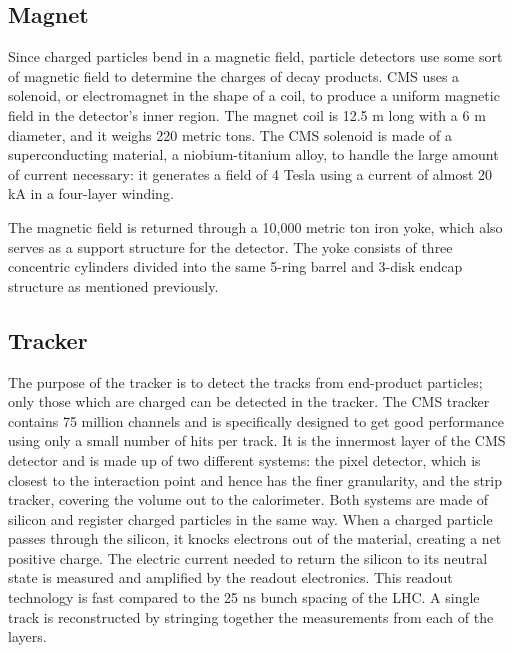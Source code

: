 \subsection{Magnet}

Since charged particles bend in a magnetic field, 
particle detectors use some sort of magnetic field to determine 
the charges of decay products.  
CMS uses a solenoid, or electromagnet in the shape of a coil, 
to produce a uniform magnetic field in the detector's inner region.  
The magnet coil is 12.5 m long with a 6 m diameter, 
and it weighs 220 metric tons.  
The CMS solenoid is made of a superconducting material, 
a niobium-titanium alloy, 
to handle the large amount of current necessary: 
it generates a field of 4 Tesla using 
a current of almost 20 kA in a four-layer winding.

The magnetic field is returned through a 10,000 metric ton iron yoke, 
which also serves as a support structure for the detector.  
The yoke consists of three concentric cylinders divided into the same 
5-ring barrel and 3-disk endcap structure as mentioned previously.  

\subsection{Tracker}
The purpose of the tracker is to detect the 
tracks from end-product particles;
only those which are charged can be detected in the tracker.  
The CMS tracker contains 75 million channels
and is specifically designed to get good performance 
using only a small number of hits per track.
It is the innermost layer of the CMS detector
and is made up of two different systems: 
the pixel detector, 
which is closest to the interaction point and hence has the finer granularity, 
and the strip tracker, 
covering the volume out to the calorimeter. 
Both systems are made of silicon and register charged particles in the same way. 
When a charged particle passes through the silicon,
it knocks electrons out of the material, 
creating a net positive charge.  
The electric current needed to return the silicon
to its neutral state is measured and amplified
by the readout electronics.  
This readout technology is fast compared to the 
25 ns bunch spacing of the LHC.  
A single track is reconstructed by stringing together
the measurements from each of the layers.  

